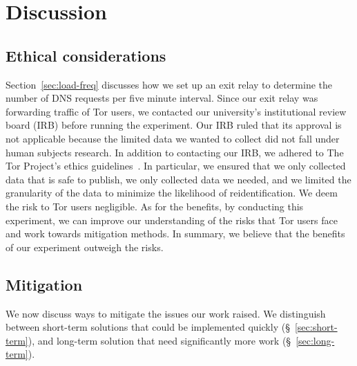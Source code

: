 \section{Discussion}
\label{sec:discussion}

\subsection{Ethical considerations}
\label{sec:ethics}

Section~\ref{sec:load-freq} discusses how we set up an exit relay to determine
the number of DNS requests per five minute interval.  Since our exit relay was
forwarding traffic of Tor users, we contacted our university's institutional
review board (IRB) before running the experiment.  Our IRB ruled that its
approval is not applicable because the limited data we wanted to collect did not
fall under human subjects research.  In addition to contacting our IRB, we
adhered to The Tor Project's ethics guidelines~\cite{ethics-guidelines}.  In
particular, \first we ensured that we only collected data that is safe to
publish, \second we only collected data we needed, and \third we limited the
granularity of the data to minimize the likelihood of reidentification.  We deem
the risk to Tor users negligible.  As for the benefits, by conducting this
experiment, we can improve our understanding of the risks that Tor users face
and work towards mitigation methods.  In summary, we believe that the benefits
of our experiment outweigh the risks.

\subsection{Mitigation}
We now discuss ways to mitigate the issues our work raised.  We distinguish
between short-term solutions that could be implemented quickly
(\S~\ref{sec:short-term}), and long-term solution that need significantly more
work (\S~\ref{sec:long-term}).

